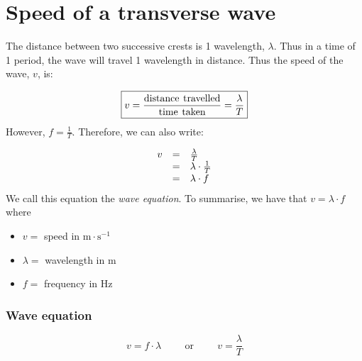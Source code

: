     \noindent
      \label{m38806*uid21}
            \section{Speed of a transverse wave}
            \nopagebreak
   
        \label{m38806*id319706}The distance between two successive crests is 1 wavelength, $\lambda $. Thus in a time of 1 period, the wave will travel 1 wavelength in distance. Thus the speed of the wave, $v$, is:\par 
        \label{m38806*id319732}\nopagebreak\noindent{}
    \begin{equation}\nonumber
    \boxed{v=\frac{\text{distance}\phantom{\rule{4.pt}{0ex}}\text{travelled}}{\text{time}\phantom{\rule{4.pt}{0ex}}\text{taken}}=\frac{\lambda }{T}}
      \end{equation}
        \label{m38806*id319776}However, $f=\frac{1}{T}$. Therefore, we can also write:\par 
        \label{m38806*id319802}\nopagebreak\noindent{}
          
    \begin{equation}\nonumber
    \begin{array}{ccc}\hfill v& =& \frac{\lambda }{T}\hfill \\ & =& \lambda \ensuremath{\cdot}\frac{1}{T}\hfill \\ & =& \lambda \ensuremath{\cdot}f\hfill \end{array}
      \end{equation}
        \label{m38806*id319870}We call this equation the \textsl{wave equation}. To summarise, we have that $v=\lambda \ensuremath{\cdot}f$ where\par 
        \label{m38806*id319901}\begin{itemize}[noitemsep]
            \label{m38806*uid22}\item $v=$ speed in $\text{m}\ensuremath{\cdot}\text{s}{}^{-1}$\label{m38806*uid23}\item $\lambda =$ wavelength in $\text{m}$
\label{m38806*uid24}\item $f=$ frequency in $\text{Hz}$
\end{itemize}

\subsubsection{Wave equation}
\begin{equation*}\nonumber
    \boxed{v = f\cdot \lambda}\hspace{1cm}\text{or}\hspace{1cm} \boxed{v = \frac{\lambda }{T}}
      \end{equation*}

